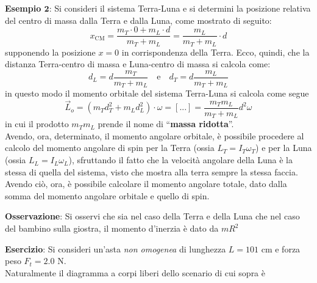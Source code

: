 \documentclass[a4paper]{extarticle}
\newcommand{\quotes}[1]{``#1''}
\begin{document}
\vspace{1em}
\noindent
\textbf{Esempio $\boldsymbol{2}$}: Si consideri il sistema Terra-Luna e si determini la posizione relativa del centro di massa dalla Terra e dalla Luna, come mostrato di seguito:
\[x_{\text{CM}} = \frac{m_T \cdot 0 + m_L \cdot d}{m_T + m_L} = \frac{m_L}{m_T + m_L} \cdot d\]
supponendo la posizione $x=0$ in corrispondenza della Terra. Ecco, quindi, che la distanza Terra-centro di massa e Luna-centro di massa si calcola come:
\[d_L=d \frac{m_T}{m_T+m_L} \hspace{1em} \text{e} \hspace{1em} d_T=d \frac{m_L}{m_T+m_L}\]
in questo modo il momento orbitale del sistema Terra-Luna si calcola come segue
\[\vec L_o = (m_T d_T^2 + m_L d_L^2) \cdot \omega = [...] = \frac{m_T m_L}{m_T+m_L} d^2 \omega\]
in cui il prodotto $m_T m_L$ prende il nome di \quotes{\textbf{massa ridotta}}.\\
Avendo, ora, determinato, il momento angolare orbitale, è possibile procedere al calcolo del momento angolare di spin per la Terra (ossia $L_T = I_T \omega_T$) e per la Luna (ossia $L_L = I_L \omega_L$), sfruttando il fatto che la velocità angolare della Luna è la stessa di quella del sistema, visto che mostra alla terra sempre la stessa faccia. Avendo ciò, ora, è possibile calcolare il momento angolare totale, dato dalla somma del momento angolare orbitale e quello di spin.

\vspace{1em}
\noindent
\textbf{Osservazione}: Si osservi che sia nel caso della Terra e della Luna che nel caso del bambino sulla giostra, il momento d'inerzia è dato da $m R^2$

\vspace{1em}
\noindent
\textbf{Esercizio}: Si consideri un'asta \emph{non omogenea} di lunghezza $L=101$ cm e forza peso $F_t=2.0$ N.\\
Naturalmente il diagramma a corpi liberi dello scenario di cui sopra è

\begin{figure}[H]
  \centering
  \caption{}
  \label{}
\end{figure}
\end{document}
